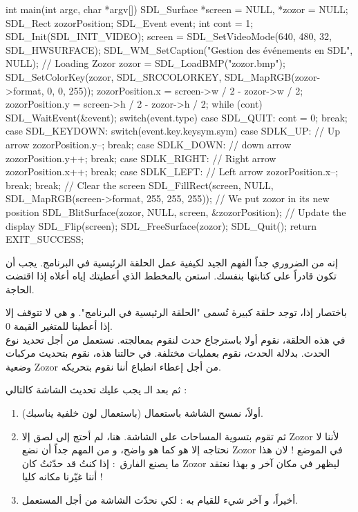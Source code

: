 \begin{Csource}
int main(int argc, char *argv[])
{
	SDL_Surface *screen = NULL, *zozor = NULL;
	SDL_Rect zozorPosition;
	SDL_Event event;
	int cont = 1;
	SDL_Init(SDL_INIT_VIDEO);
	screen = SDL_SetVideoMode(640, 480, 32, SDL_HWSURFACE);
	SDL_WM_SetCaption("Gestion des événements en SDL", NULL);
	// Loading Zozor
	zozor = SDL_LoadBMP("zozor.bmp");
	SDL_SetColorKey(zozor, SDL_SRCCOLORKEY, SDL_MapRGB(zozor->format, 0, 0, 255));
	zozorPosition.x = screen->w / 2 - zozor->w / 2;
	zozorPosition.y = screen->h / 2 - zozor->h / 2;
	while (cont)
	{
		SDL_WaitEvent(&event);
		switch(event.type)
		{
			case SDL_QUIT:
			cont = 0;
			break;
			case SDL_KEYDOWN:
			switch(event.key.keysym.sym)
			{
				case SDLK_UP: // Up arrow
				zozorPosition.y--;
				break;
				case SDLK_DOWN: // down arrow
				zozorPosition.y++;
				break;
				case SDLK_RIGHT: // Right arrow
				zozorPosition.x++;
				break;
				case SDLK_LEFT: // Left arrow
				zozorPosition.x--;
				break;
			}
			break;
		}
		// Clear the screen
		SDL_FillRect(screen, NULL, SDL_MapRGB(screen->format, 255, 255, 255));
		// We put zozor in its new position
		SDL_BlitSurface(zozor, NULL, screen, &zozorPosition);
		// Update the display
		SDL_Flip(screen);
	}
	SDL_FreeSurface(zozor);
	SDL_Quit();
	return EXIT_SUCCESS;
}
\end{Csource}

إنه من الضروري جداً الفهم الجيد لكيفية عمل الحلقة الرئيسية في البرنامج. يجب أن تكون قادراً على كتابتها بنفسك. استعن بالمخطط الذي أعطيتك إياه أعلاه إذا اقتضت الحاجة.

باختصار إذا، توجد حلقة كبيرة تُسمى "الحلقة الرئيسية في البرنامج". و هي لا تتوقف إلا إذا أعطينا للمتغير 
القيمة 0.\\
في هذه الحلقة، نقوم أولا باسترجاع حدث لنقوم بمعالجته. نستعمل 
من أجل تحديد نوع الحدث. بدلالة الحدث، نقوم بعمليات مختلفة. في حالتنا هذه، نقوم بتحديث مركبات وضعية
\textenglish{Zozor}
من أجل إعطاء انطباع أننا نقوم بتحريكه.

ثم بعد الـ
يجب عليك تحديث الشاشة كالتالي :

\begin{enumerate}
	\item أولاً، نمسح الشاشة باستعمال
	(باستعمال لون خلفية يناسبك).
	\item ثم تقوم بتسوية المساحات على الشاشة. هنا، لم أحتج إلى لصق إلا
	\textenglish{Zozor}
	لأننا لا نحتاجه إلا هو كما هو واضح، و من المهم جداً أن نضع
	\textenglish{Zozor}
	في الموضع
	 !
	لان هذا ما يصنع الفارق~: إذا كنتُ قد حدّثتُ
	كان
	\textenglish{Zozor}
	ليظهر في مكان آخر و بهذا نعتقد أننا غيّرنا مكانه كليا !
	\item أخيراً، و آخر شيء للقيام به :
	لكي نحدّث الشاشة من أجل المستعمل.
\end{enumerate}

